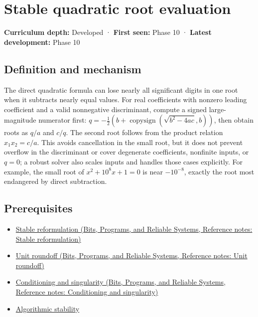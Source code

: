 \hypertarget{appendix-b9afba7f63e5}{}\label{referencestart:appendix-b9afba7f63e5}
\section{Stable quadratic root evaluation}\label{appendix-b9afba7f63e5-stable-quadratic-root-evaluation}

\textbf{Curriculum depth:} Developed · \textbf{First seen:} Phase 10 · \textbf{Latest development:} Phase 10

\subsection{Definition and mechanism}\label{appendix-b9afba7f63e5-definition-and-mechanism}

The direct quadratic formula can lose nearly all significant digits in one root when it subtracts nearly equal values. For real coefficients with nonzero leading coefficient and a valid nonnegative discriminant, compute a signed large-magnitude numerator first: \(q=-\frac12(b+\operatorname{copysign}(\sqrt{b^2-4ac},b))\), then obtain roots as \(q/a\) and \(c/q\). The second root follows from the product relation \(x_1x_2=c/a\). This avoids cancellation in the small root, but it does not prevent overflow in the discriminant or cover degenerate coefficients, nonfinite inputs, or \(q=0\); a robust solver also scales inputs and handles those cases explicitly. For example, the small root of \(x^2+10^8x+1=0\) is near \(-10^{-8}\), exactly the root most endangered by direct subtraction.

\subsection{Prerequisites}\label{appendix-b9afba7f63e5-prerequisites}

\begin{itemize}
\tightlist
\item
  \href{../01-Bits-Programs-and-Reliable-Systems/main.pdf\#nameddest=appendix-d7f8ba961670}{Stable reformulation (Bits, Programs, and Reliable Systems, Reference notes: Stable reformulation)}
\item
  \href{../01-Bits-Programs-and-Reliable-Systems/main.pdf\#nameddest=appendix-bc44f7b42f42}{Unit roundoff (Bits, Programs, and Reliable Systems, Reference notes: Unit roundoff)}
\item
  \href{../01-Bits-Programs-and-Reliable-Systems/main.pdf\#nameddest=appendix-8f6a01f284a7}{Conditioning and singularity (Bits, Programs, and Reliable Systems, Reference notes: Conditioning and singularity)}
\item
  \hyperref[appendix-aa2bf0d79639]{Algorithmic stability}
\end{itemize}

